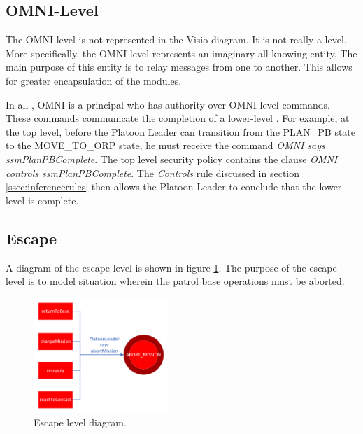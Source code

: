 \documentclass[../../main/main.tex]{subfiles}
\begin{document}
\subsection{OMNI-Level}\label{ssec:omnilevel}
The OMNI level is not represented in the Visio diagram.  It is not really a level.  More specifically, the OMNI level represents an imaginary all-knowing entity.  The main purpose of this entity is to relay messages from one  to another.  This allows for greater encapsulation of the modules. 

In all , OMNI is a principal who has authority over OMNI level commands.  These commands communicate the completion of a lower-level .  For example, at the top level, before the Platoon Leader can transition from the PLAN_PB state to the MOVE_TO_ORP state, he must receive the command \textit{OMNI says ssmPlanPBComplete}.  The top level security policy contains the clause \textit{OMNI controls ssmPlanPBComplete}.  The \textit{Controls} rule discussed in section \ref{ssec:inferencerules} then allows the Platoon Leader to conclude that the lower-level  is complete.  
\clearpage





\subsection{Escape}\label{ssec:escape}
A diagram of the escape level is shown in figure \ref{escapeDiagram}.  The purpose of the escape level is to model situation wherein the patrol base operations must be aborted.  

\begin{figure}[h!]
\centering
\includegraphics[width=0.45\textwidth]{../figures/escapeDiagram}
\caption{\label{escapeDiagram} Escape level diagram.}
\end{figure}
\end{document}
